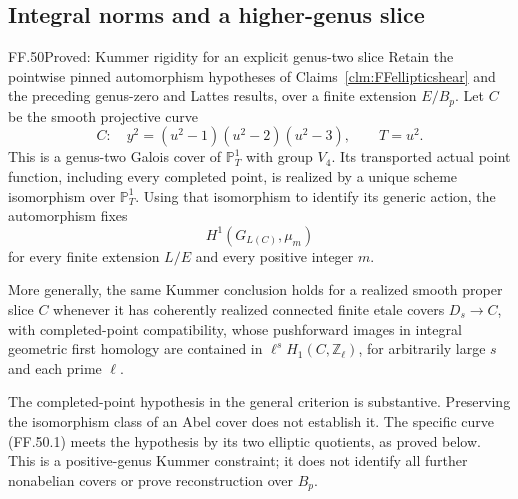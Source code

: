 \subsection{Integral norms and a higher-genus slice}

\begin{claim}{FF.50}{Proved: Kummer rigidity for an explicit genus-two slice}
\label{clm:FFhighergenusnorm}
Retain the pointwise pinned automorphism hypotheses of
Claims~\ref{clm:FFellipticshear} and the preceding
genus-zero and Lattes results, over a finite extension
\(E/B_p\). Let \(C\) be the smooth projective curve
\[
 C:\quad y^2=(u^2-1)(u^2-2)(u^2-3),\qquad T=u^2.
                                                        \tag{FF.50.1}
\]
This is a genus-two Galois cover of \(\mathbb P^1_T\)
with group \(V_4\). Its transported actual point
function, including every completed point, is realized
by a unique scheme isomorphism over \(\mathbb P^1_T\).
Using that isomorphism to identify its generic action,
the automorphism fixes
\[
                    H^1(G_{L(C)},\mu_m)
                                                        \tag{FF.50.2}
\]
for every finite extension \(L/E\) and every positive
integer \(m\).

More generally, the same Kummer conclusion holds for a
realized smooth proper slice \(C\) whenever it has
coherently realized connected finite etale covers
\(D_s\to C\), with completed-point compatibility,
whose pushforward images in integral geometric first
homology are contained in
\(\ell^sH_1(C,\mathbb Z_\ell)\), for arbitrarily
large \(s\) and each prime \(\ell\).
\end{claim}

The completed-point hypothesis in the general criterion
is substantive. Preserving the isomorphism class of an
Abel cover does not establish it. The specific curve
(FF.50.1) meets the hypothesis by its two elliptic
quotients, as proved below. This is a positive-genus
Kummer constraint; it does not identify all further
nonabelian covers or prove reconstruction over \(B_p\).

